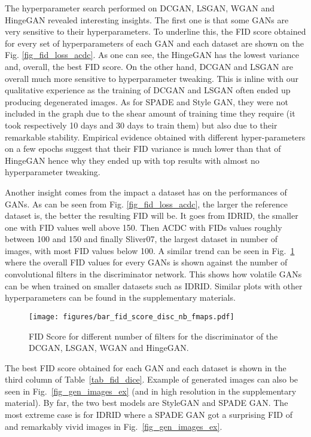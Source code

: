 \documentclass[preprint,12pt, authoryear]{elsarticle}
\begin{document}
The hyperparameter search performed on DCGAN, LSGAN, WGAN and HingeGAN revealed interesting insights.  The first one is that some GANs are very sensitive to their hyperparameters.  To underline this, the FID score obtained for every set of hyperparameters of each GAN and each dataset are shown on the Fig. \ref{fig_fid_loss_acdc}.  As one can see, the HingeGAN has the lowest variance and, overall, the best FID score.  On the other hand, DCGAN and LSGAN are overall much more sensitive to hyperparameter tweaking.  This is inline with our qualitative experience as the training of DCGAN and LSGAN often ended up producing degenerated images.   As for SPADE and Style GAN, they were not included in the graph due to the shear amount of training time they require (it took respectively 10 days and 30 days to train them) but also due to their remarkable stability.  Empirical evidence obtained with different hyper-parameters on a few epochs  suggest that their FID variance is much lower than that of HingeGAN hence why they ended up with top results with almost no hyperparameter tweaking.

Another insight comes from the impact a dataset has on the performances of GANs.  As can be seen from Fig. \ref{fig_fid_loss_acdc}, the larger the reference dataset is, the better the resulting FID will be.  It goes from IDRID, the smaller one with FID values well above 150.  Then ACDC with FIDs values roughly between 100 and 150 and finally Sliver07, the largest dataset in number of images, with most FID values below 100.  A similar trend can be seen in Fig.~\ref{fid_hparams} where the overall FID values for every GANs is shown against the number of convolutional filters in the discriminator network.  This shows how volatile GANs can be when trained on smaller datasets such as IDRID.  Similar plots with other hyperparameters can be found in the supplementary materials.

\begin{figure}[tp]
\centering
\texttt{[image: figures/bar\_fid\_score\_disc\_nb\_fmaps.pdf]}
\caption{\small FID Score for different number of filters for the discriminator of the DCGAN, LSGAN, WGAN and HingeGAN.}
\label{fid_hparams}
\end{figure}

The best FID score obtained for each GAN and each dataset is shown in  the third column of Table~\ref{tab_fid_dice}.  Example of generated images can also be seen in Fig.~\ref{fig_gen_images_ex} (and in high resolution in the supplementary material).  By far, the two best models are StyleGAN and SPADE GAN.   The most extreme case is for IDRID where a SPADE GAN got a surprising FID of  and remarkably vivid images in  Fig.~\ref{fig_gen_images_ex}.  
 
\end{document}
